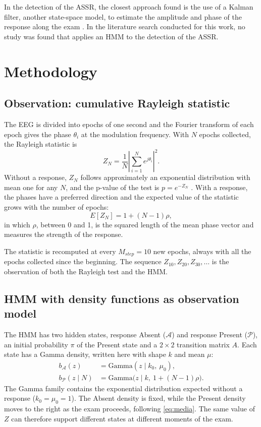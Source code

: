 \documentclass[conference]{IEEEtran}
\begin{document}
In the detection of the ASSR, the closest approach found is the use of a Kalman filter, another state-space model, to estimate the amplitude and phase of the response along the exam \cite{luke2017}. In the literature search conducted for this work, no study was found that applies an HMM to the detection of the ASSR.

\section{Methodology}

\subsection{Observation: cumulative Rayleigh statistic}

The EEG is divided into epochs of one second and the Fourier transform of each epoch gives the phase $\theta_i$ at the modulation frequency. With $N$ epochs collected, the Rayleigh statistic is
\begin{equation}
Z_N=\frac{1}{N}\left|\sum_{i=1}^{N}e^{j\theta_i}\right|^2 .
\label{eq:z}
\end{equation}
Without a response, $Z_N$ follows approximately an exponential distribution with mean one for any $N$, and the p-value of the test is $p=e^{-Z_N}$ \cite{mardia2000}. With a response, the phases have a preferred direction and the expected value of the statistic grows with the number of epochs:
\begin{equation}
E[Z_N]=1+(N-1)\rho ,
\label{eq:media}
\end{equation}
in which $\rho$, between 0 and 1, is the squared length of the mean phase vector and measures the strength of the response.

The statistic is recomputed at every $M_{step}=10$ new epochs, always with all the epochs collected since the beginning. The sequence $Z_{10}, Z_{20}, Z_{30},\ldots$ is the observation of both the Rayleigh test and the HMM.

\subsection{HMM with density functions as observation model}

The HMM has two hidden states, response Absent ($\mathcal{A}$) and response Present ($\mathcal{P}$), an initial probability $\pi$ of the Present state and a $2\times2$ transition matrix $A$. Each state has a Gamma density, written here with shape $k$ and mean $\mu$:
\begin{align}
b_{\mathcal{A}}(z) &= \mathrm{Gamma}(z \mid k_0,\ \mu_0), \label{eq:aus}\\
b_{\mathcal{P}}(z \mid N) &= \mathrm{Gamma}\big(z \mid k,\ 1+(N-1)\rho\big). \label{eq:pres}
\end{align}
The Gamma family contains the exponential distribution expected without a response ($k_0=\mu_0=1$). The Absent density is fixed, while the Present density moves to the right as the exam proceeds, following \eqref{eq:media}. The same value of $Z$ can therefore support different states at different moments of the exam.
\end{document}
